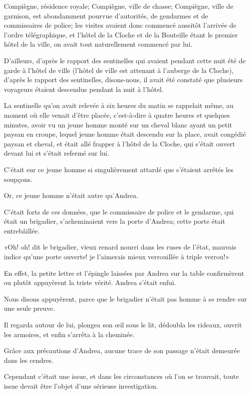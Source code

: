 Compiègne, résidence royale; Compiègne, ville de chasse; Compiègne, ville de garnison, est abondamment pourvue d'autorités, de gendarmes et de commissaires de police; les visites avaient donc commencé aussitôt l'arrivée de l'ordre télégraphique, et l'hôtel de la Cloche et de la Bouteille étant le premier hôtel de la ville, on avait tout naturellement commencé par lui. 

D'ailleurs, d'après le rapport des sentinelles qui avaient pendant cette nuit été de garde à l'hôtel de ville (l'hôtel de ville est attenant à l'auberge de la Cloche), d'après le rapport des sentinelles, disons-nous, il avait été constaté que plusieurs voyageurs étaient descendus pendant la nuit à l'hôtel. 

La sentinelle qu'on avait relevée à six heures du matin se rappelait même, au moment où elle venait d'être placée, c'est-à-dire à quatre heures et quelques minutes, avoir vu un jeune homme monté sur un cheval blanc ayant un petit paysan en croupe, lequel jeune homme était descendu sur la place, avait congédié paysan et cheval, et était allé frapper à l'hôtel de la Cloche, qui s'était ouvert devant lui et s'était refermé sur lui. 

C'était sur ce jeune homme si singulièrement attardé que s'étaient arrêtés les soupçons. 

Or, ce jeune homme n'était autre qu'Andrea. 

C'était forts de ces données, que le commissaire de police et le gendarme, qui était un brigadier, s'acheminaient vers la porte d'Andrea; cette porte était entrebâillée. 

«Oh! oh! dit le brigadier, vieux renard nourri dans les ruses de l'état, mauvais indice qu'une porte ouverte! je l'aimerais mieux verrouillée à triple verrou!» 

En effet, la petite lettre et l'épingle laissées par Andrea sur la table confirmèrent ou plutôt appuyèrent la triste vérité. Andrea s'était enfui. 

Nous disons appuyèrent, parce que le brigadier n'était pas homme à se rendre sur une seule preuve. 

Il regarda autour de lui, plongea son œil sous le lit, dédoubla les rideaux, ouvrit les armoires, et enfin s'arrêta à la cheminée. 

Grâce aux précautions d'Andrea, aucune trace de son passage n'était demeurée dans les cendres. 

Cependant c'était une issue, et dans les circonstances où l'on se trouvait, toute issue devait être l'objet d'une sérieuse investigation. 

